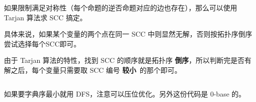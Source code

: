 如果限制满足对称性（每个命题的逆否命题对应的边也存在），那么可以使用 Tarjan 算法求 SCC 搞定。 

具体来说，如果某个变量的两个点在同一 SCC 中则显然无解，否则按拓扑序倒序尝试选择每个SCC即可。

由于 Tarjan 算法的特性，找到 SCC 的顺序就是拓扑序 \textbf{倒序}，所以判断完是否有解之后，每个变量只需要取 SCC 编号 \textbf{较小}\ 的那个即可。

\inputminted{cpp}{../src/graph/2sat-tarjan.cpp}

如果要字典序最小就用 DFS，注意可以压位优化。另外这份代码是 0-base 的。

\inputminted{cpp}{../src/graph/2sat.cpp}
